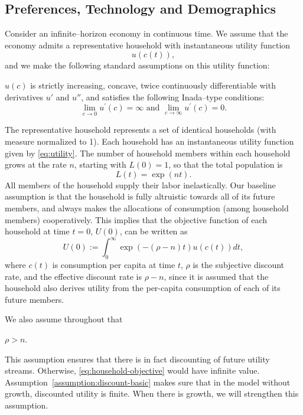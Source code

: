\documentclass[\topdir/lecture\_notes.tex]{subfiles}
\begin{document}
\subsection{Preferences, Technology and Demographics}
Consider an infinite--horizon economy in continuous time.
We assume that the economy admits a representative household with instantaneous utility function
\begin{equation}
  u(c(t)),
  \label{eq:utility}
\end{equation}
and we make the following standard assumptions on this utility function:
\begin{assumption}
  \label{assumption:utility}
  $u(c)$ is strictly increasing, concave, twice continuously differentiable with derivatives $u'$ and $u''$, and satisfies the following Inada--type conditions:
  \[
    \lim _{c \rightarrow 0} u^{\prime}(c)=\infty \text { and } \lim _{c \rightarrow \infty} u^{\prime}(c)=0.
  \]
\end{assumption}
The representative household represents a set of identical households (with measure normalized to 1).
Each household has an instantaneous utility function given by \eqref{eq:utility}.
The number of household members within each household grows at the rate $n$, starting with $L(0)=1$, so that the total population is
\begin{equation*}
  L(t)=\exp(nt).
\end{equation*}
All members of the household supply their labor inelastically.
Our baseline assumption is that the household is fully altruistic towards all of its future members, and always makes the allocations of consumption (among household members) cooperatively.
This implies that the objective function of each household at time $t=0$, $U(0)$, can be written as
\begin{equation}
  U(0) := \int_{0}^{\infty} \exp(-(\rho-n) t) u(c(t)) dt,
  \label{eq:household-objective}
\end{equation}
where $c(t)$ is consumption per capita at time $t$, $\rho$ is the subjective discount rate, and the effective discount rate is $\rho-n$, since it is assumed that the household also derives utility from the per-capita consumption of each of its future members.

We also assume throughout that
\begin{assumption}
  \label{assumption:discount-basic}
  $\rho>n$.
\end{assumption}
This assumption ensures that there is in fact discounting of future utility streams.
Otherwise, \eqref{eq:household-objective} would have infinite value.
Assumption~\ref{assumption:discount-basic} makes sure that in the model without growth, discounted utility is finite.
When there is growth, we will strengthen this assumption.
\end{document}
